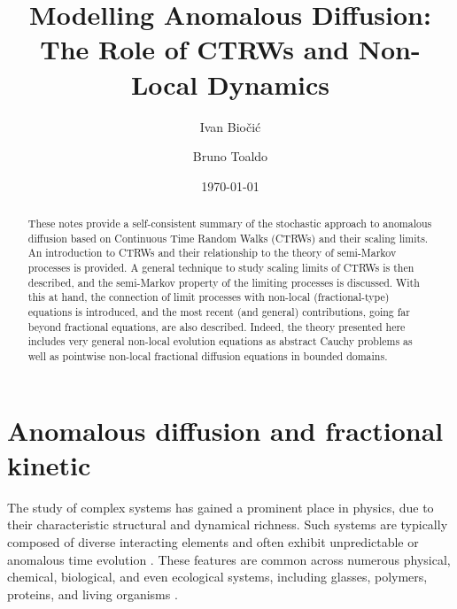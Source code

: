 \documentclass[reqno]{amsart}
\title[]{Modelling Anomalous Diffusion: The Role of CTRWs and Non-Local Dynamics}
\author{Ivan Bio\v{c}i\'{c}}
\author{Bruno Toaldo}
\date{\today}
\theoremstyle{remark}
\numberwithin{equation}{section} %
\newcommand{\1}{\mathds{1}}
\begin{document}
	
	\maketitle
	
	\begin{abstract}
		These notes provide a self-consistent summary of the stochastic approach to anomalous diffusion based on Continuous Time Random Walks (CTRWs) and their scaling limits. An introduction to CTRWs and their relationship to the theory of semi-Markov processes is provided. A general technique to study scaling limits of CTRWs is then described, and the semi-Markov property of the limiting processes is discussed. With this at hand, the connection of limit processes with non-local (fractional-type) equations is introduced, and the most recent (and general) contributions, going far beyond fractional equations, are also described. Indeed, the theory presented here includes very general non-local evolution equations as abstract Cauchy problems as well as pointwise non-local fractional diffusion equations in bounded domains.
	\end{abstract}
	
	{\hypersetup{linkcolor=black}
		\tableofcontents
	}
	
	
	
	\section{Anomalous diffusion and fractional kinetic}
	
	
	The study of complex systems has gained a prominent place in physics, due to their characteristic structural and dynamical richness. Such systems are typically composed of diverse interacting elements and often exhibit unpredictable or anomalous time evolution \cite{mandelbrot1982, havlin2002}. These features are common across numerous physical, chemical, biological, and even ecological systems, including glasses, polymers, proteins, and living organisms \cite{bouchaud1990, metzler2000, klages2008}.
	
\end{document}
